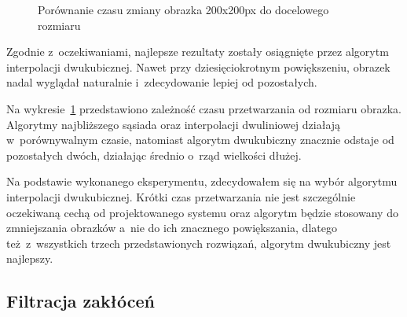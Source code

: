 \begin{figure}[h]
    \centering
    \caption{Porównanie czasu zmiany obrazka 200x200px do docelowego rozmiaru}
    \label{fig:resizing-time}
\end{figure}

Zgodnie z~oczekiwaniami, najlepsze rezultaty zostały osiągnięte przez algorytm interpolacji dwukubicznej. Nawet przy dziesięciokrotnym powiększeniu, obrazek nadal wyglądał naturalnie i~zdecydowanie lepiej od pozostałych.  

Na wykresie~\ref{fig:resizing-time} przedstawiono zależność czasu przetwarzania od rozmiaru obrazka. Algorytmy najbliższego sąsiada oraz interpolacji dwuliniowej działają w~porównywalnym czasie, natomiast algorytm dwukubiczny znacznie odstaje od pozostałych dwóch, działając średnio o~rząd wielkości dłużej.

Na podstawie wykonanego eksperymentu, zdecydowałem się na wybór algorytmu interpolacji dwukubicznej. Krótki czas przetwarzania nie jest szczególnie oczekiwaną cechą od projektowanego systemu oraz algorytm będzie stosowany do zmniejszania obrazków a~nie do ich znacznego powiększania, dlatego też z~wszystkich trzech przedstawionych rozwiązań, algorytm dwukubiczny jest najlepszy.

\subsection{Filtracja zakłóceń}
